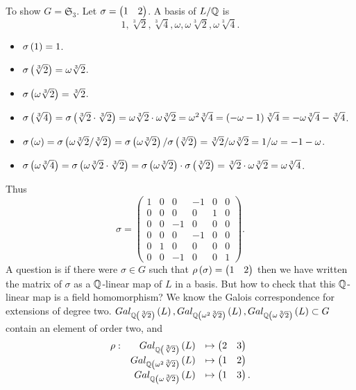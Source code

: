 \begin{example}
To show $ G = \mathfrak{S}_3 $. Let $ \sigma = \onebytwo{1}{2} $. A basis of $ L / \Q $ is
$$ 1, \sqrt[3]{2}, \sqrt[3]{4}, \omega, \omega\sqrt[3]{2}, \omega\sqrt[3]{4}. $$
\begin{itemize}
\item $ \sigma\rb{1} = 1 $.
\item $ \sigma\rb{\sqrt[3]{2}} = \omega\sqrt[3]{2} $.
\item $ \sigma\rb{\omega\sqrt[3]{2}} = \sqrt[3]{2} $.
\item $ \sigma\rb{\sqrt[3]{4}} = \sigma\rb{\sqrt[3]{2} \cdot \sqrt[3]{2}} = \omega\sqrt[3]{2} \cdot \omega\sqrt[3]{2} = \omega^2\sqrt[3]{4} = \rb{-\omega - 1}\sqrt[3]{4} = -\omega\sqrt[3]{4} - \sqrt[3]{4} $.
\item $ \sigma\rb{\omega} = \sigma\rb{\omega\sqrt[3]{2} / \sqrt[3]{2}} = \sigma\rb{\omega\sqrt[3]{2}} / \sigma\rb{\sqrt[3]{2}} = \sqrt[3]{2} / \omega\sqrt[3]{2} = 1 / \omega = -1 - \omega $.
\item $ \sigma\rb{\omega\sqrt[3]{4}} = \sigma\rb{\omega\sqrt[3]{2} \cdot \sqrt[3]{2}} = \sigma\rb{\omega\sqrt[3]{2}} \cdot \sigma\rb{\sqrt[3]{2}} = \sqrt[3]{2} \cdot \omega\sqrt[3]{2} = \omega\sqrt[3]{4} $.
\end{itemize}
Thus
$$ \sigma =
\begin{pmatrix}
1 & 0 & 0 & -1 & 0 & 0 \\
0 & 0 & 0 & 0 & 1 & 0 \\
0 & 0 & -1 & 0 & 0 & 0 \\
0 & 0 & 0 & -1 & 0 & 0 \\
0 & 1 & 0 & 0 & 0 & 0 \\
0 & 0 & -1 & 0 & 0 & 1
\end{pmatrix}.
$$
A question is if there were $ \sigma \in G $ such that $ \rho\rb{\sigma} = \onebytwo{1}{2} $ then we have written the matrix of $ \sigma $ as a $ \Q $-linear map of $ L $ in a basis. But how to check that this $ \Q $-linear map is a field homomorphism? We know the Galois correspondence for extensions of degree two. $ Gal_{\Q\rb{\sqrt[3]{2}}}\rb{L}, Gal_{\Q\rb{\omega^2\sqrt[3]{2}}}\rb{L}, Gal_{\Q\rb{\omega\sqrt[3]{2}}}\rb{L} \subset G $ contain an element of order two, and
$$
\begin{array}{rrl}
\rho : & Gal_{\Q\rb{\sqrt[3]{2}}}\rb{L} & \mapsto \onebytwo{2}{3} \\
& Gal_{\Q\rb{\omega^2\sqrt[3]{2}}}\rb{L} & \mapsto \onebytwo{1}{2} \\
& Gal_{\Q\rb{\omega\sqrt[3]{2}}}\rb{L} & \mapsto \onebytwo{1}{3}.

\end{array}$$
\end{example}
